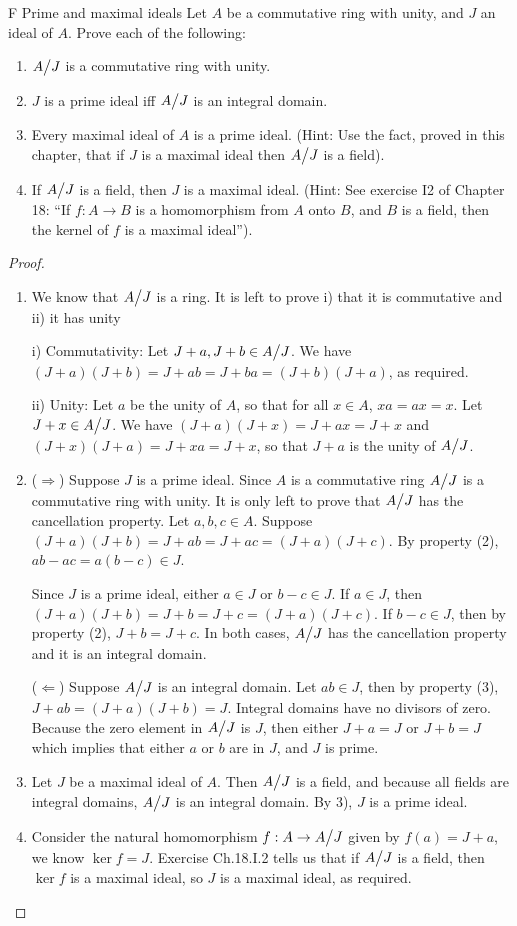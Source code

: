 \begin{exercise}{F Prime and maximal ideals}
Let $A$ be a commutative ring with unity, and $J$ an ideal of $A$. Prove each of the following:
  \begin{enumerate}
      \item ${\textstyle A}\big/{\textstyle J}$ is a commutative ring with unity.
      \item $J$ is a prime ideal iff ${\textstyle A}\big/{\textstyle J}$ is an integral domain.
      \item Every maximal ideal of $A$ is a prime ideal. (Hint: Use the fact, proved in this chapter, that if $J$ is a maximal ideal then ${\textstyle A}\big/{\textstyle J}$ is a field).
      \item If ${\textstyle A}\big/{\textstyle J}$ is a field, then $J$ is a maximal ideal. (Hint: See exercise I2 of Chapter 18: ``If $f:A\rightarrow B$ is a homomorphism from $A$ onto $B$, and $B$ is a field, then the kernel of $f$ is a maximal ideal'').
  \end{enumerate}
\end{exercise}
\begin{proof}
 \begin{enumerate}
     \item We know that ${\textstyle A}\big/{\textstyle J}$ is a ring. It is left to prove i) that it is commutative and ii) it has unity

     i) Commutativity: Let $J+a, J+b\in{\textstyle A}\big/{\textstyle J}$. We have $(J+a)(J+b)=J+ab=J+ba=(J+b)(J+a)$, as required.

     ii) Unity: Let $a$ be the unity of $A$, so that for all $x\in A$, $xa=ax=x$. Let $J+x\in{\textstyle A}\big/{\textstyle J}$. We have $(J+a)(J+x)=J+ax=J+x$ and $(J+x)(J+a)=J+xa=J+x$, so that $J+a$ is the unity of ${\textstyle A}\big/{\textstyle J}$.
     \item ($\Rightarrow$) Suppose $J$ is a prime ideal. Since $A$ is a commutative ring ${\textstyle A}\big/{\textstyle J}$ is a commutative ring with unity. It is only left to prove that ${\textstyle A}\big/{\textstyle J}$ has the cancellation property. Let $a,b,c\in A$. Suppose $(J+a)(J+b)=J+ab=J+ac=(J+a)(J+c)$. By property (2), $ab-ac=a(b-c)\in J$. 

     Since $J$ is a prime ideal, either $a\in J$ or $b-c\in J$. If $a\in J$, then $(J+a)(J+b)=J+b=J+c=(J+a)(J+c)$. If $b-c\in J$, then by property (2), $J+b=J+c$. In both cases, ${\textstyle A}\big/{\textstyle J}$ has the cancellation property and it is an integral domain.

     ($\Leftarrow$) Suppose ${\textstyle A}\big/{\textstyle J}$ is an integral domain. Let $ab\in J$, then by property (3), $J+ab=(J+a)(J+b)=J$. Integral domains have no divisors of zero. Because the zero element in ${\textstyle A}\big/{\textstyle J}$ is $J$, then either $J+a=J$ or $J+b=J$ which implies that either $a$ or $b$ are in $J$, and $J$ is prime.
     \item Let $J$ be a maximal ideal of $A$. Then ${\textstyle A}\big/{\textstyle J}$ is a field, and because all fields are integral domains, ${\textstyle A}\big/{\textstyle J}$ is an integral domain. By 3), $J$ is a prime ideal.
     \item Consider the natural homomorphism $f:A\rightarrow{\textstyle A}\big/{\textstyle J}$ given by $f(a)=J+a$, we know $\ker f=J$. Exercise Ch.18.I.2 tells us that if ${\textstyle A}\big/{\textstyle J}$ is a field, then $\ker f$ is a maximal ideal, so $J$ is a maximal ideal, as required.
 \end{enumerate}
\end{proof}


